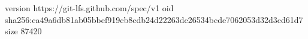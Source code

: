 version https://git-lfs.github.com/spec/v1
oid sha256:ca49a6db81ab05bbef919cb8cdb24d22263dc26534bcde7062053d32d3cd61d7
size 87420
